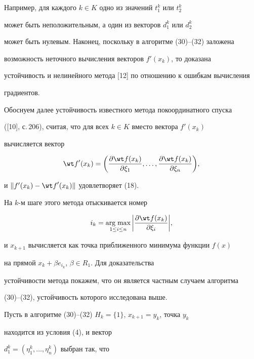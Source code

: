 Например, для каждого $k\in K$ одно из значений $t_1^k$ или $t_2^k$


может быть неположительным, а один из векторов $d_1^k$ или $d_2^k$


может быть нулевым. Наконец, поскольку в алгоритме (30)--(32) заложена


возможность неточного вычисления векторов ${f}'(x_k)$, то доказана


устойчивость и нелинейного метода [12] по отношению к ошибкам вычисления


градиентов.





Обоснуем далее устойчивость известного метода покоординатного спуска


([10], с.\,206), считая, что для всех $k\in K$ вместо вектора ${f}'(x_k)$


вычисляется вектор


$$


{\wt f}'(x_k)=\bigg({\frac{\partial\wt f(x_k)}{\partial\xi_1},\dotsc,


\frac{\partial\wt f(x_k)}{\partial\xi_n}}\bigg),


$$


и $\|{{f}'(x_k)-{\wt f}'(x_k)}\|$ удовлетворяет (18).


На $k$-м шаге этого метода отыскивается номер


\begin{equation}


i_k=\argmax_{1\le i\le n}


\bigg|{\frac{\partial\wt f(x_k)}{\partial\xi_i}}\bigg|,


\end{equation}


и $x_{k+1}$ вычисляется как точка приближенного минимума функции $f(x)$


на прямой $x_k+\beta e_{i_k}$, $\beta\in R_1$. Для доказательства


устойчивости метода покажем, что он является частным случаем алгоритма


(30)--(32), устойчивость которого исследована выше.





Пусть в алгоритме (30)--(32) $H_k=\{1\}$, $x_{k+1}=y_k$, точка $y_k$


находится из условия (4), и вектор


$d_1^k=(\eta_1^k,\dotsc,\eta_n^k)$ выбран так, что


